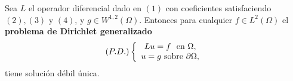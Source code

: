 



\begin{theorem}
Sea $L$ el operador diferencial dado en $\left(  1\right)  $ con coeficientes
satisfaciendo $\left(  2\right)  ,\left(  3\right)  $ y $\left(  4\right)  $,
y $g\in W^{1,2}\left(  \Omega\right)  $. Entonces para cualquier $f\in
L^{2}\left(  \Omega\right)  $ el \textbf{problema de Dirichlet generalizado}
\[
\left(  P.D.\right)  \left\{
\begin{array}
[c]{c}%
Lu=f\text{ \ en }\Omega,\\
u=g\text{ sobre }\partial\Omega,
\end{array}
\right.
\]
tiene soluci\'{o}n d\'{e}bil \'{u}nica.
\end{theorem}

%
%
%

